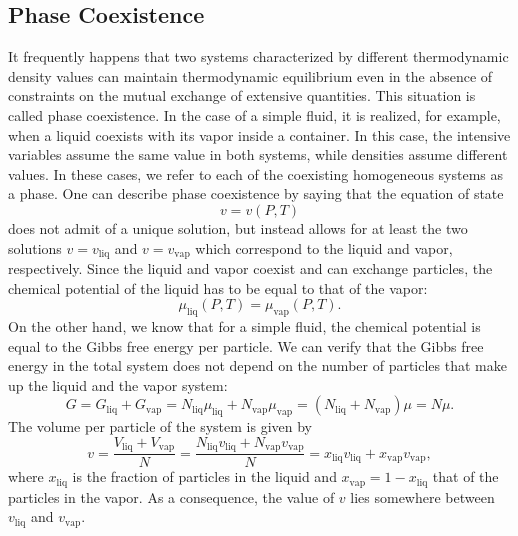 \subsection{Phase Coexistence}
It frequently happens that two systems characterized by different thermodynamic density values can maintain thermodynamic equilibrium even in the absence of constraints on the mutual exchange of extensive quantities. This situation is called phase coexistence.
In the case of a simple fluid, it is realized, for example, when a liquid coexists with its vapor inside a container. In this case, the intensive variables assume the same value in both systems, while densities assume different values. In these cases, we refer to each of the coexisting homogeneous systems as a phase.
One can describe phase coexistence by saying that the equation of state
\[v = v(P,T)\]
does not admit of a unique solution, but instead allows for at least the two solutions $v = v_{\mathrm{liq}}$ and $v = v_{\mathrm{vap}}$ which correspond to the liquid and vapor, respectively.
Since the liquid and vapor coexist and can exchange particles, the chemical potential of the liquid has to be equal to that of the vapor:
\[\mu_{\mathrm{liq}}(P,T) = \mu_{\mathrm{vap}}(P,T).\]
On the other hand, we know that for a simple fluid, the chemical potential is equal to the Gibbs free energy per particle. We can verify that the Gibbs free energy in the total system does not depend on the number of particles that make up the liquid and the vapor system:
\[G= G_{\mathrm{liq}} + G_{\mathrm{vap}} = N_{\mathrm{liq}}\mu_{\mathrm{liq}} + N_{\mathrm{vap}}\mu_{\mathrm{vap}} = (N_{\mathrm{liq}}+N_{\mathrm{vap}})\mu = N\mu.\]
The volume per particle of the system is given by
\[v = \frac{V_{\mathrm{liq}}+V_{\mathrm{vap}}}{N} = \frac{N_{\mathrm{liq}}v_{\mathrm{liq}} + N_{\mathrm{vap}}v_{\mathrm{vap}}}{N} = x_{\mathrm{liq}}v_{\mathrm{liq}}+ x_{\mathrm{vap}}v_{\mathrm{vap}},\]
where $x_{\mathrm{liq}}$ is the fraction of particles in the liquid and $x_{\mathrm{vap}} = 1 - x_{\mathrm{liq}}$ that of the particles in the vapor. As a consequence, the value of $v$ lies somewhere between $v_{\mathrm{liq}}$ and $v_{\mathrm{vap}}$.


